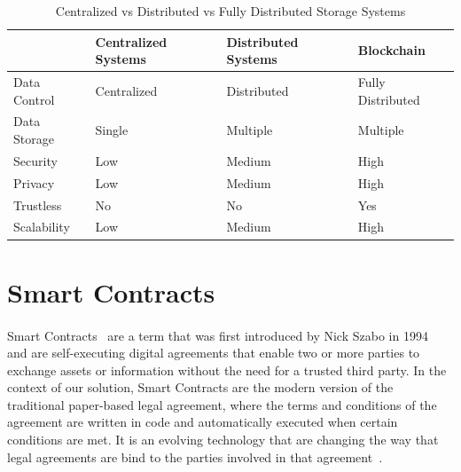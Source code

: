\begin{table}[h]\label{tab:centralized-vs-distributed-vs-blockchain}
    \centering
    \renewcommand{\arraystretch}{1.5} %
    \begin{tabular}{|l|l|l|l|}
        \hline
                     & \textbf{Centralized Systems} & \textbf{Distributed Systems} & \textbf{Blockchain} \\ \hline
        Data Control & Centralized                  & Distributed                  & Fully Distributed   \\ \hline
        Data Storage & Single                       & Multiple                     & Multiple            \\ \hline
        Security     & Low                          & Medium                       & High                \\ \hline
        Privacy      & Low                          & Medium                       & High                \\ \hline
        Trustless    & No                           & No                           & Yes                 \\ \hline
        Scalability  & Low                          & Medium                       & High                \\ \hline
    \end{tabular}
    \caption{Centralized vs Distributed vs Fully Distributed Storage Systems}
\end{table}

\section{Smart Contracts}\label{sec:smart-contracts}
\paragraph{}

Smart Contracts~\cite{vigliotti2021we} are a term that was first introduced by Nick Szabo in 1994~\cite{szabo2017winning} and are self-executing digital agreements that enable two or more parties to exchange
assets or information without the need for a trusted third party.
In the context of our solution, Smart Contracts are the modern version of the traditional paper-based legal agreement, where the terms and conditions of the agreement are written in code and automatically executed when certain conditions are met.
It is an evolving technology that are changing the way that legal agreements are bind to the parties involved in that agreement~\cite{Kaur2023}.

